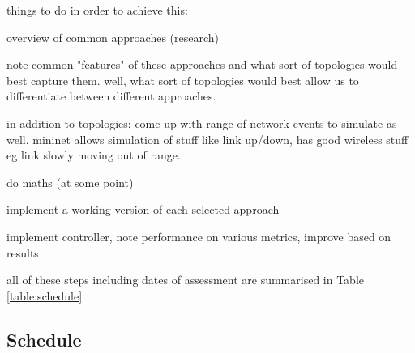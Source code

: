 \documentclass[pdftex,12pt,a4paper]{article}
\begin{document}
things to do in order to achieve this:

overview of common approaches (research)

note common "features" of these approaches and what sort of topologies would best capture them. well, what sort of topologies would best allow us to differentiate between different approaches.

in addition to topologies: come up with range of network events to simulate as well. mininet allows simulation of stuff like link up/down, has good wireless stuff eg link slowly moving out of range.

do maths (at some point)

implement a working version of each selected approach

implement controller, note performance on various metrics, improve based on results

all of these steps including dates of assessment are summarised in Table \ref{table:schedule}

\subsection{Schedule}
\end{document}

